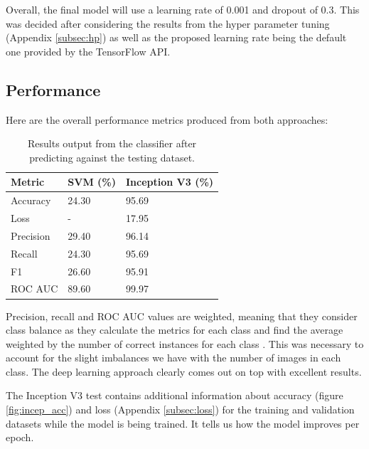 \documentclass[12pt,a4paper]{report}
\begin{document}
\par

Overall, the final model will use a learning rate of 0.001 and dropout of 0.3. This was decided after considering the 
results from the hyper parameter tuning (Appendix \ref{subsec:hp}) as well as the proposed learning rate being the 
default one provided by the TensorFlow API.

\subsection{Performance}

Here are the overall performance metrics produced from both approaches:

\begin{table}[h!]
    \centering
    \begin{tabular}{ |l|l|l| }
        \hline
        Metric & SVM (\%) & Inception V3 (\%) \\
        \hline
        \hline
        Accuracy & 24.30 & 95.69 \\
        \hline
        Loss & - & 17.95 \\
        \hline
        Precision & 29.40 & 96.14 \\
        \hline
        Recall & 24.30 & 95.69 \\
        \hline
        F1 & 26.60 & 95.91 \\
        \hline
        ROC AUC & 89.60 & 99.97 \\
        \hline
    \end{tabular}
    \caption{Results output from the classifier after predicting against the testing dataset.}
    \label{table:2}
\end{table}

\break

Precision, recall and ROC AUC values are weighted, meaning that they consider class balance as they calculate the metrics
for each class and find the average weighted by the number of correct instances for each class 
\citep{scikitprec}. This was necessary to account for the slight imbalances we have with the number of images 
in each class. The deep learning approach clearly comes out on top with excellent results.

\par

The Inception V3 test contains additional information about accuracy (figure \ref{fig:incep_acc}) and loss 
(Appendix \ref{subsec:loss}) for the training and validation datasets 
while the model is being trained. It tells us how the model improves per epoch.
\end{document}
